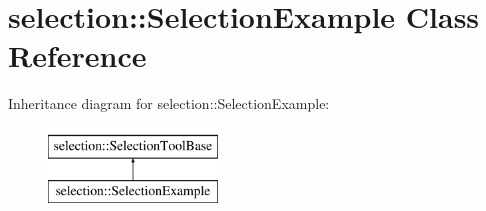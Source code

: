 \hypertarget{classselection_1_1SelectionExample}{}\section{selection\+:\+:Selection\+Example Class Reference}
\label{classselection_1_1SelectionExample}
Inheritance diagram for selection\+:\+:Selection\+Example\+:\begin{figure}[H]
\begin{center}
\leavevmode
\includegraphics[height=2.000000cm]{classselection_1_1SelectionExample}
\end{center}
\end{figure}
